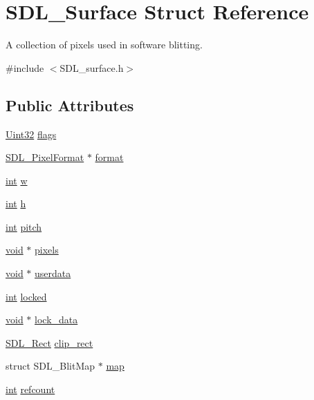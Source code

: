 \hypertarget{struct_s_d_l___surface}{\section{S\-D\-L\-\_\-\-Surface Struct Reference}
\label{struct_s_d_l___surface}
}


A collection of pixels used in software blitting.  




{\ttfamily \#include $<$S\-D\-L\-\_\-surface.\-h$>$}

\subsection*{Public Attributes}
\begin{DoxyCompactItemize}
\item 
\hyperlink{_s_d_l__stdinc_8h_add440eff171ea5f55cb00c4a9ab8672d}{Uint32} \hyperlink{struct_s_d_l___surface_a86d78b665d5dfd7aa1dd9696b067641b}{flags}
\item 
\hyperlink{struct_s_d_l___pixel_format}{S\-D\-L\-\_\-\-Pixel\-Format} $\ast$ \hyperlink{struct_s_d_l___surface_a0a90721f947c10c3b79e02ccb419ca62}{format}
\item 
\hyperlink{_s_d_l__thread_8h_a6a64f9be4433e4de6e2f2f548cf3c08e}{int} \hyperlink{struct_s_d_l___surface_a9b0ec7185dcdb2a3530a9160a6ea83d9}{w}
\item 
\hyperlink{_s_d_l__thread_8h_a6a64f9be4433e4de6e2f2f548cf3c08e}{int} \hyperlink{struct_s_d_l___surface_af33bcf87a1f5e10a99b3c7e8626b38c8}{h}
\item 
\hyperlink{_s_d_l__thread_8h_a6a64f9be4433e4de6e2f2f548cf3c08e}{int} \hyperlink{struct_s_d_l___surface_a5fa37325d77d65b2ed64ffc7cd01bb6c}{pitch}
\item 
\hyperlink{_s_d_l__opengles2__gl2ext_8h_ae5d8fa23ad07c48bb609509eae494c95}{void} $\ast$ \hyperlink{struct_s_d_l___surface_abd9597e0e084b8ef33fe0397bc26d911}{pixels}
\item 
\hyperlink{_s_d_l__opengles2__gl2ext_8h_ae5d8fa23ad07c48bb609509eae494c95}{void} $\ast$ \hyperlink{struct_s_d_l___surface_ae66d973dcb9b57cb34815892e1ee1f31}{userdata}
\item 
\hyperlink{_s_d_l__thread_8h_a6a64f9be4433e4de6e2f2f548cf3c08e}{int} \hyperlink{struct_s_d_l___surface_a5022edaeea1c0a055fa5d6dccba41de2}{locked}
\item 
\hyperlink{_s_d_l__opengles2__gl2ext_8h_ae5d8fa23ad07c48bb609509eae494c95}{void} $\ast$ \hyperlink{struct_s_d_l___surface_a0afacfb933b54a9af0846a307a6924fb}{lock\-\_\-data}
\item 
\hyperlink{struct_s_d_l___rect}{S\-D\-L\-\_\-\-Rect} \hyperlink{struct_s_d_l___surface_aa9a0da3b38261dad6cf0cc4e3bb5b0c3}{clip\-\_\-rect}
\item 
struct S\-D\-L\-\_\-\-Blit\-Map $\ast$ \hyperlink{struct_s_d_l___surface_a8c1ecad399b0d4f525b1a53b6ee9393f}{map}
\item 
\hyperlink{_s_d_l__thread_8h_a6a64f9be4433e4de6e2f2f548cf3c08e}{int} \hyperlink{struct_s_d_l___surface_a03d10628a359c0674f5ceffd574f1641}{refcount}
\end{DoxyCompactItemize}


